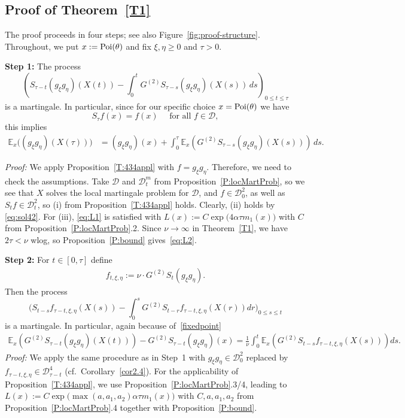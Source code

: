 \documentclass{imsart}
\theoremstyle{plain}
\theoremstyle{definition}
\begin{document}
\subsection{Proof of Theorem~\ref{T1}}
The proof proceeds in four steps; see also Figure~\ref{fig:proof-structure}. Throughout, we put $x:= {\rm Poi}(\theta)$ and fix $\xi, \eta \ge 0$ and $\tau > 0$.

\noindent\textbf{Step 1:} The process
$$
\left(
S_{\tau-t}(g_\xi g_\eta)(X(t))
-
\int_0^t
G^{(2)}S_{\tau-s}(g_\xi g_\eta)(X(s))\,ds
\right)_{0\leq t\leq\tau}
$$
is a martingale. In particular, since for our specific choice $x={\rm Poi}(\theta)$ we have 
\begin{equation}\label{fixedpoint}
S_\tau f (x) = f(x) \quad \mbox{ for all } f\in \mathcal D,
\end{equation}
this implies 
\begin{align}
  \label{eq:toshow2}
  \mathbb E_{x}\big((g_\xi g_\eta)(X(\tau))\big)
  &=
  (g_\xi g_\eta)(x)
  +
  \int_0^\tau
  \mathbb E_{x}\left(
  G^{(2)} S_{\tau-s}(g_\xi g_\eta)(X(s))
  \right)\,ds.
\end{align}

\emph{Proof:}
We apply Proposition~\ref{T:434appl} with $f=g_\xi g_\eta$. Therefore, we need to check the assumptions. Take $\mathcal D$ and $\mathcal D_t^m$ from  Proposition~\ref{P:locMartProb}, so we see that $X$ solves the local martingale problem for $\mathcal D$, and $f \in \mathcal D_0^2$, as well as $S_t f \in \mathcal D_t^2$, so (i) from Proposition~\ref{T:434appl} holds. Clearly, (ii) holds by  \eqref{eq:sol42}. For (iii), \eqref{eq:L1} is satisfied with $L(x) := C \exp\big(4\alpha \tau m_1(x)\big)$ with $C$ from Proposition~\ref{P:locMartProb}.2. Since $\nu \to \infty$ in Theorem~\ref{T1}, we have $2\tau < \nu$ wlog, so Proposition~\ref{P:bound} gives~\eqref{eq:L2}.

\noindent\textbf{Step 2:}  For $t \in [0,\tau]$ define
\begin{align}
    \label{eq:ftxieta}
    f_{t,\xi,\eta} := \nu \cdot G^{(2)}S_t (g_\xi g_\eta).
\end{align}
Then the process
$$ \Big(S_{t-s}f_{\tau-t,\xi,\eta}(X(s)) - \int_0^s G^{(2)} S_{t-r} f_{\tau-t,\xi,\eta}(X(r))dr\Big)_{0\leq s\leq t} $$
is a martingale. In particular, again because of~\eqref{fixedpoint}
\begin{align}\label{eq:G2G2}
    \mathbb E_x\left(G^{(2)}S_{\tau-t} (g_\xi g_\eta)(X(t))\right) \!-\! G^{(2)}S_{\tau-t} (g_\xi g_\eta)(x) \!=\! \frac 1 \nu \int_0^t \!\mathbb E_x\left(G^{(2)} S_{t-s} f_{\tau-t, \xi, \eta}(X(s))\right) ds. 
\end{align}
{\em Proof:} We apply the same procedure as in Step~1 with $g_\xi g_\eta \in \mathcal D_0^2$ replaced by $f_{\tau-t, \xi, \eta} \in \mathcal D_{\tau-t}^4$ (cf.\ Corollary~\ref{cor2.4}). For the applicability of Proposition~\ref{T:434appl}, we use Proposition~\ref{P:locMartProb}.3/4, leading to $L(x) := C \exp\big(\max(a, a_1, a_2) \alpha \tau m_1(x) \big)$ with $C, a, a_1, a_2$ from Proposition~\ref{P:locMartProb}.4 together with Proposition~\ref{P:bound}.
\end{document}
